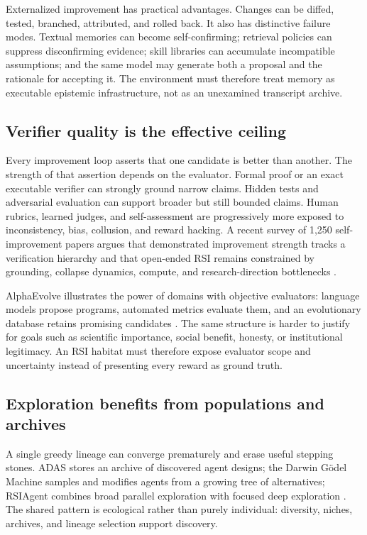 \documentclass[11pt,a4paper]{article}
\begin{document}
Externalized improvement has practical advantages. Changes can be diffed, tested, branched, attributed, and rolled back. It also has distinctive failure modes. Textual memories can become self-confirming; retrieval policies can suppress disconfirming evidence; skill libraries can accumulate incompatible assumptions; and the same model may generate both a proposal and the rationale for accepting it. The environment must therefore treat memory as executable epistemic infrastructure, not as an unexamined transcript archive.

\subsection{Verifier quality is the effective ceiling}

Every improvement loop asserts that one candidate is better than another. The strength of that assertion depends on the evaluator. Formal proof or an exact executable verifier can strongly ground narrow claims. Hidden tests and adversarial evaluation can support broader but still bounded claims. Human rubrics, learned judges, and self-assessment are progressively more exposed to inconsistency, bias, collusion, and reward hacking. A recent survey of 1,250 self-improvement papers argues that demonstrated improvement strength tracks a verification hierarchy and that open-ended RSI remains constrained by grounding, collapse dynamics, compute, and research-direction bottlenecks \cite{rsisurvey}.

AlphaEvolve illustrates the power of domains with objective evaluators: language models propose programs, automated metrics evaluate them, and an evolutionary database retains promising candidates \cite{alphaevolve}. The same structure is harder to justify for goals such as scientific importance, social benefit, honesty, or institutional legitimacy. An RSI habitat must therefore expose evaluator scope and uncertainty instead of presenting every reward as ground truth.

\subsection{Exploration benefits from populations and archives}

A single greedy lineage can converge prematurely and erase useful stepping stones. ADAS stores an archive of discovered agent designs; the Darwin G\"odel Machine samples and modifies agents from a growing tree of alternatives; RSIAgent combines broad parallel exploration with focused deep exploration \cite{adas,dgm,rsiagent}. The shared pattern is ecological rather than purely individual: diversity, niches, archives, and lineage selection support discovery.
\end{document}
